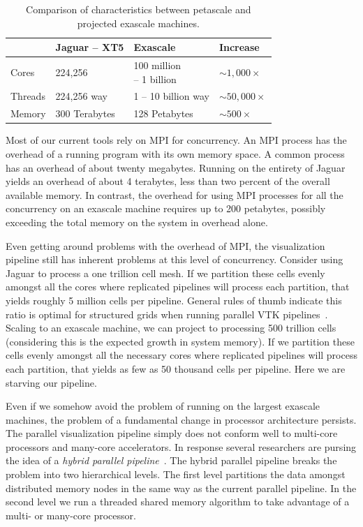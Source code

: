 \documentclass{vgtc}                          %
\newcommand*{\lcite}[1]{~\cite{#1}}
\newcommand*{\keyterm}[1]{\emph{#1}}
\begin{document}
\begin{table}[htbp]
  \centering
  \caption{Comparison of characteristics between petascale and projected
    exascale machines.}
  \label{table:PetaExaCompare}
  \vspace{6pt}
  \begin{tabular}{llll}
    & Jaguar -- XT5 & Exascale & Increase \\
    \hline
    Cores & 224,256 & \parbox{.7in}{\vspace*{2pt}100 million\\ \hspace*{6pt} -- 1 billion\vspace*{2pt}} & $\sim{}1,000\times$ \\
    Threads & 224,256 way & 1 -- 10 billion way & $\sim{}50,000\times$ \\
    Memory & 300 Terabytes & 128 Petabytes & $\sim{}500\times$
  \end{tabular}
\end{table}

Most of our current tools rely on MPI for concurrency.  An MPI process has
the overhead of a running program with its own memory space.  A common
process has an overhead of about twenty megabytes.  Running on the entirety
of Jaguar yields an overhead of about 4 terabytes, less than two percent of
the overall available memory.  In contrast, the overhead for using MPI
processes for all the concurrency on an exascale machine requires up to 200
petabytes, possibly exceeding the total memory on the system in overhead
alone.

Even getting around problems with the overhead of MPI, the visualization
pipeline still has inherent problems at this level of concurrency.
Consider using Jaguar to process a one trillion cell mesh.  If we partition
these cells evenly amongst all the cores where replicated pipelines will
process each partition, that yields roughly 5 million cells per pipeline.
General rules of thumb indicate this ratio is optimal for structured grids
when running parallel VTK pipelines\lcite{ParaViewTutorial}.  Scaling to an
exascale machine, we can project to processing 500 trillion cells
(considering this is the expected growth in system memory).  If we
partition these cells evenly amongst all the necessary cores where
replicated pipelines will process each partition, that yields as few as 50
thousand cells per pipeline.  Here we are starving our pipeline.

Even if we somehow avoid the problem of running on the largest exascale
machines, the problem of a fundamental change in processor architecture
persists.  The parallel visualization pipeline simply does not conform well
to multi-core processors and many-core accelerators.  In response several
researchers are pursing the idea of a \keyterm{hybrid parallel
  pipeline}\lcite{Camp10,Howison11,Li08}.  The hybrid parallel pipeline
breaks the problem into two hierarchical levels.  The first level
partitions the data amongst distributed memory nodes in the same way as the
current parallel pipeline.  In the second level we run a threaded shared
memory algorithm to take advantage of a multi- or many-core processor.
\end{document}
